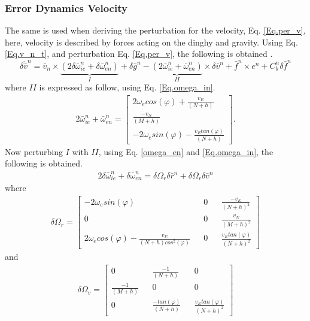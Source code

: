 \subsubsection{Error Dynamics Velocity}
The same is used when deriving the perturbation for the velocity, Eq. \eqref{Eq.per_v}, here, velocity is described by forces acting on the dinghy and gravity. Using Eq. \eqref{Eq.v_n_t}, and perturbation Eq. \eqref{Eq.per_v}, the following is obtained \cite{nonlinear}.
\begin{equation}
\delta \dot{\bar{v}}^n = \bar{v}_n \times \underbrace{(2\delta \bar{\omega}_{ie}^n+ \delta \bar{\omega}_{en}^n)}_{I}+\delta \bar{g}^n -\underbrace{(2\bar{\omega}_{ie}^n + \bar{\omega}_{en}^n)}_{II}\times \delta \bar{v}^n + \bar{f}^n\times e^n +C_b^n\delta \bar{f}^n
\label{Eq.delta_v}
\end{equation}
where $II$ is expressed as follow, using Eq. \eqref{Eq.omega_in}.
\begin{align}
2\bar{\omega}_{ie}^n + \bar{\omega}_{en}^n = 
\begin{bmatrix}
2\omega_e cos(\varphi) + \frac{v_E}{(N+h)} \\
\frac{-v_N}{(M+h)} \\
-2\omega_e sin(\varphi) - \frac{v_E tan(\varphi)}{(N+h)}
\end{bmatrix}.
\label{Eq.II}
\end{align}
Now perturbing $I$ with $II$, using Eq. \eqref{omega_en} and \eqref{Eq.omega_in}, the following is obtained.
\begin{align}
2\delta \bar{\omega}_{ie}^n+ \delta \bar{\omega}_{en}^n =
\delta \Omega_r\delta \bar{r}^n + \delta\Omega_r\delta\bar{v}^n
\end{align}
where
\begin{align}
\delta\Omega_r = 
\begin{bmatrix}
-2 \omega_e sin(\varphi) && 0 && \frac{-v_E}{(N+h)^2}\\
0 && 0 && \frac{v_N}{(M+h)^2}\\
2 \omega_e cos(\varphi)-\frac{v_E}{(N+h)cos^2(\varphi)} && 0 && \frac{v_E tan(\varphi)}{(N+h)^2}
\end{bmatrix}
\label{Eq.Omega_r}
\end{align}
and
\begin{align}
\delta\Omega_v = 
\begin{bmatrix}
0 &&  \frac{-1}{(N+h)} && 0\\
\frac{-1}{(M+h)} && 0 && 0\\
0 && \frac{-tan(\varphi)}{(N+h)} && \frac{v_E tan(\varphi)}{(N+h)^2}
\end{bmatrix}
\label{Eq.Omega_v}
\end{align}
